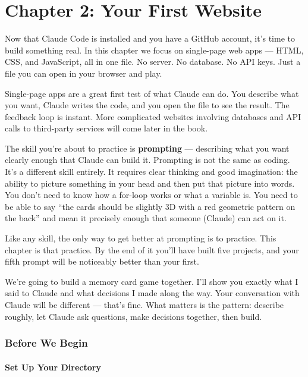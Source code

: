 \documentclass[11pt,a4paper]{article}
\begin{document}
\part*{Chapter 2: Your First Website}

Now that Claude Code is installed and you have a GitHub account, it's time to build something real. In this chapter we focus on single-page web apps --- HTML, CSS, and JavaScript, all in one file. No server. No database. No API keys. Just a file you can open in your browser and play.

Single-page apps are a great first test of what Claude can do. You describe what you want, Claude writes the code, and you open the file to see the result. The feedback loop is instant. More complicated websites involving databases and API calls to third-party services will come later in the book.

The skill you're about to practice is \textbf{prompting} --- describing what you want clearly enough that Claude can build it. Prompting is not the same as coding. It's a different skill entirely. It requires clear thinking and good imagination: the ability to picture something in your head and then put that picture into words. You don't need to know how a for-loop works or what a variable is. You need to be able to say ``the cards should be slightly 3D with a red geometric pattern on the back'' and mean it precisely enough that someone (Claude) can act on it.

Like any skill, the only way to get better at prompting is to practice. This chapter is that practice. By the end of it you'll have built five projects, and your fifth prompt will be noticeably better than your first.

We're going to build a memory card game together. I'll show you exactly what I said to Claude and what decisions I made along the way. Your conversation with Claude will be different --- that's fine. What matters is the pattern: describe roughly, let Claude ask questions, make decisions together, then build.

\section{Before We Begin}

\subsection{Set Up Your Directory}
\end{document}
